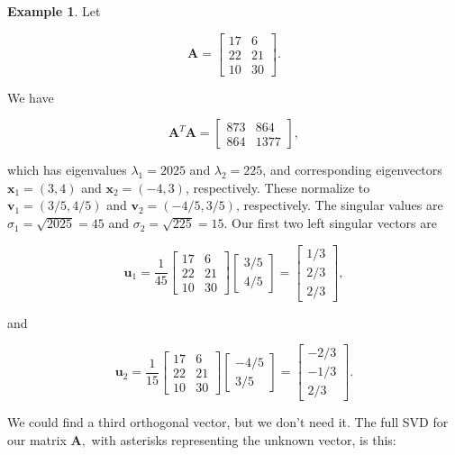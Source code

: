 \documentclass[
]{book}
\theoremstyle{definition}
\theoremstyle{definition}
\newtheorem{example}{Example}[chapter]
\theoremstyle{definition}
\theoremstyle{definition}
\theoremstyle{remark}
\begin{document}
\begin{examplebox}

\begin{example}
\protect\hypertarget{exm:svdnsq}{}\label{exm:svdnsq}Let

\[\mathbf{A}=\begin{bmatrix} 17 & 6\\22 & 21\\10 & 30\end{bmatrix}.\]

We have

\[\mathbf{A}^T\mathbf{A}=\begin{bmatrix}873 & 864 \\864 & 1377\end{bmatrix},\]

which has eigenvalues \(\lambda_1=2025\) and \(\lambda_2=225\), and corresponding eigenvectors \(\mathbf{x}_1=(3,4)\) and \(\mathbf{x}_2=(-4,3)\), respectively. These normalize to \(\mathbf{v}_1=(3/5,4/5)\) and \(\mathbf{v}_2=(-4/5,3/5)\), respectively. The singular values are \(\sigma_1=\sqrt{2025}=45\) and \(\sigma_2=\sqrt{225}=15\). Our first two left singular vectors are

\[\mathbf{u}_1=\frac{1}{45}\begin{bmatrix}17 & 6\\22 & 21\\10 & 30\end{bmatrix}\begin{bmatrix}3/5\\4/5\end{bmatrix}=\begin{bmatrix}1/3\\2/3\\2/3\end{bmatrix},\]

and

\[\mathbf{u}_2=\frac{1}{15}\begin{bmatrix}17 & 6\\22 & 21\\10 & 30\end{bmatrix}\begin{bmatrix}-4/5\\3/5\end{bmatrix}=\begin{bmatrix}-2/3\\-1/3\\2/3\end{bmatrix}.\]

We could find a third orthogonal vector, but we don't need it. The full SVD for our matrix \(\mathbf{A},\) with asterisks representing the unknown vector, is this:


\end{example}
\end{examplebox}
\end{document}
